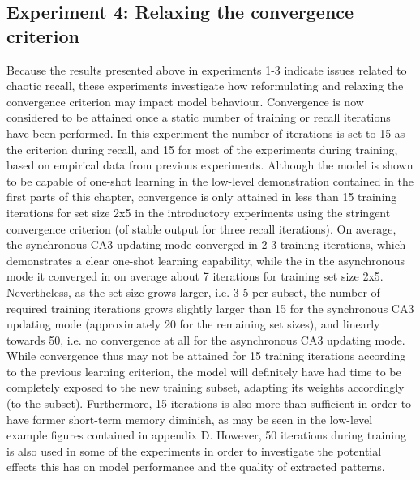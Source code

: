 \subsection{Experiment 4: Relaxing the convergence criterion}\label{sect:relaxed-criterion}

Because the results presented above in experiments 1-3 indicate issues related to chaotic recall, these experiments investigate how reformulating and relaxing the convergence criterion may impact model behaviour. Convergence is now considered to be attained once a static number of training or recall iterations have been performed. In this experiment the number of iterations is set to 15 as the criterion during recall, and 15 for most of the experiments during training, based on empirical data from previous experiments.
Although the model is shown to be capable of one-shot learning in the low-level demonstration contained in the first parts of this chapter, convergence is only attained in less than 15 training iterations for set size 2x5 in the introductory experiments using the stringent convergence criterion (of stable output for three recall iterations). On average, the synchronous CA3 updating mode converged in 2-3 training iterations, which demonstrates a clear one-shot learning capability, while the in the asynchronous mode it converged in on average about 7 iterations for training set size 2x5. 
%
Nevertheless, as the set size grows larger, i.e. 3-5 per subset, the number of required training iterations grows slightly larger than 15 for the synchronous CA3 updating mode (approximately 20 for the remaining set sizes), and linearly towards 50, i.e. no convergence at all for the asynchronous CA3 updating mode.
While convergence thus may not be attained for 15 training iterations according to the previous learning criterion, the model will definitely have had time to be completely exposed to the new training subset, adapting its weights accordingly (to the subset). Furthermore, 15 iterations is also more than sufficient in order to have former short-term memory diminish, as may be seen in the low-level example figures contained in appendix D.
However, 50 iterations during training is also used in some of the experiments in order to investigate the potential effects this has on model performance and the quality of extracted patterns.

